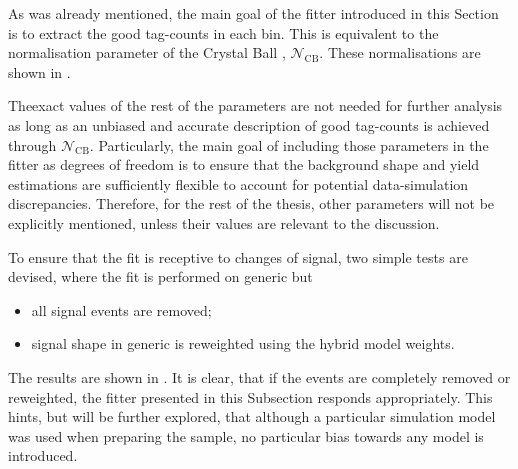 As was already mentioned, the main goal of the \Mbc fitter introduced in this Section is to extract the good tag-\B counts in each \EB bin.
This is equivalent to the normalisation parameter of the Crystal Ball \PDF, $\mathcal{N}_{\mathrm{CB}}$.
These normalisations are shown in .

Theexact values of the rest of the parameters are not needed for further analysis as long as an unbiased and accurate description of good tag-\B counts is achieved through $\mathcal{N}_{\mathrm{CB}}$.
Particularly, the main goal of including those parameters in the fitter as degrees of freedom is to ensure that the \Mbc background shape and yield estimations are sufficiently flexible to account for potential data-simulation discrepancies.
Therefore, for the rest of the thesis, other parameters will not be explicitly mentioned, unless their values are relevant to the discussion.

To ensure that the fit is receptive to changes of \BtoXsgamma signal, two simple tests are devised, where the fit is performed on generic \MC but
\begin{itemize}
    \item all \BtoXsgamma signal events are removed;
    \item \BtoXsgamma signal shape in generic \MC is reweighted using the hybrid model weights.
\end{itemize}
The results are shown in .
It is clear, that if the \BtoXsgamma events are completely removed or reweighted, the \Mbc fitter presented in this Subsection responds appropriately.
This hints, but will be further explored, that although a particular simulation model was used when preparing the sample, no particular bias towards any \BtoXsgamma model is introduced.

